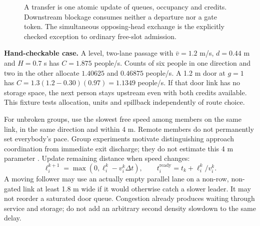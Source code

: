 \documentclass[11pt,a4paper]{article}
\begin{document}
\begin{figure}[htbp]\centering
{}
\caption{A transfer is one atomic update of queues, occupancy and credits. Downstream blockage consumes neither a departure nor a gate token. The simultaneous opposing-head exchange is the explicitly checked exception to ordinary free-slot admission.}
\label{fig:queues}
\end{figure}

\textbf{Hand-checkable case.} A level, two-lane passage with $\bar v=1.2$ m/s, $d=0.44$ m and $H=0.7$ s has $C=1.875$ people/s. Counts of six people in one direction and two in the other allocate $1.40625$ and $0.46875$ people/s. A 1.2 m door at $g=1$ has $C=1.3(1.2-0.30)(0.97)=1.1349$ people/s. If that door link has no storage space, the next person stays upstream even with both credits available. This fixture tests allocation, units and spillback independently of route choice.

For unbroken groups, use the slowest free speed among members on the same link, in the same direction and within 4 m. Remote members do not permanently set everybody's pace. Group experiments motivate distinguishing approach coordination from immediate exit discharge; they do not estimate this 4 m parameter \cite{bode}. Update remaining distance when speed changes:
\begin{equation}\label{impl:eq13}
 \ell_i^{k+1}=\max(0,\ell_i^k-v_i^k\Delta t),\qquad
 t_i^{\mathrm{ready}}=t_k+\ell_i^k/v_i^k.
\end{equation}
A moving follower may use an actually empty parallel lane on a non-row, non-gated link at least 1.8 m wide if it would otherwise catch a slower leader. It may not reorder a saturated door queue. Congestion already produces waiting through service and storage; do not add an arbitrary second density slowdown to the same delay.
\end{document}
